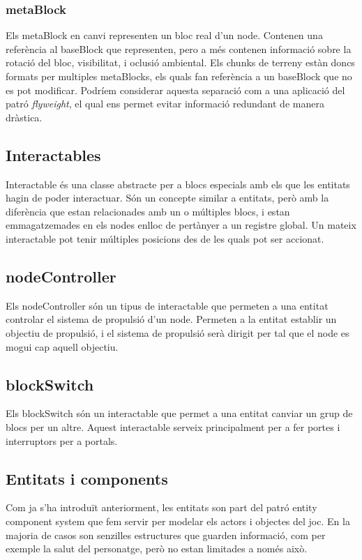 \subsubsection{metaBlock}
Els metaBlock en canvi representen un bloc real d'un node. Contenen una referència al baseBlock que representen, pero a més contenen informació sobre la rotació del bloc, visibilitat, i oclusió ambiental.
Els chunks de terreny estàn doncs formats per multiples metaBlocks, els quals fan referència a un baseBlock que no es pot modificar. Podríem considerar aquesta separació com a una aplicació del patró \textit{flyweight}, el qual ens permet evitar informació redundant de manera dràstica.
\subsection{Interactables}
Interactable és una classe abstracte per a blocs especials amb els que les entitats hagin de poder interactuar. Són un concepte similar a entitats, però amb la diferència que estan relacionades amb un o múltiples blocs, i estan emmagatzemades en els nodes enlloc de pertànyer a un registre global.
Un mateix interactable pot tenir múltiples posicions des de les quals pot ser accionat.
\subsection{nodeController}
Els nodeController són un tipus de interactable que permeten a una entitat controlar el sistema de propulsió d'un node. Permeten a la entitat establir un objectiu de propulsió, i el sistema de propulsió serà dirigit per tal que el node es mogui cap aquell objectiu.
\subsection{blockSwitch}
Els blockSwitch són un interactable que permet a una entitat canviar un grup de blocs per un altre. Aquest interactable serveix principalment per a fer portes i interruptors per a portals.
\subsection{Entitats i components}
Com ja s'ha introduït anteriorment, les entitats son part del patró entity component system que fem servir per modelar els actors i objectes del joc. En la majoria de casos son senzilles estructures que guarden informació, com per exemple la salut del personatge, però no estan limitades a només això.
